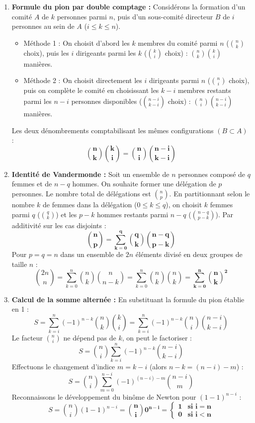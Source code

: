 \documentclass[11pt,a4paper]{article}
\begin{document}
\begin{correctionbox}
\begin{enumerate}
    \item \textbf{Formule du pion par double comptage :}
    Considérons la formation d'un comité $A$ de $k$ personnes parmi $n$, puis d'un sous-comité directeur $B$ de $i$ personnes au sein de $A$ ($i \le k \le n$).
    \begin{itemize}[label=$\bullet$]
        \item Méthode 1 : On choisit d'abord les $k$ membres du comité parmi $n$ ($\binom{n}{k}$ choix), puis les $i$ dirigeants parmi les $k$ ($\binom{k}{i}$ choix) : $\binom{n}{k} \binom{k}{i}$ manières.
        \item Méthode 2 : On choisit directement les $i$ dirigeants parmi $n$ ($\binom{n}{i}$ choix), puis on complète le comité en choisissant les $k - i$ membres restants parmi les $n - i$ personnes disponibles ($\binom{n-i}{k-i}$ choix) : $\binom{n}{i} \binom{n-i}{k-i}$ manières.
    \end{itemize}
    Les deux dénombrements comptabilisant les mêmes configurations $(B \subset A)$ :
    \[
    \mathbf{\binom{n}{k} \binom{k}{i} = \binom{n}{i} \binom{n - i}{k - i}}
    \]

    \item \textbf{Identité de Vandermonde :}
    Soit un ensemble de $n$ personnes composé de $q$ femmes et de $n - q$ hommes.
    On souhaite former une délégation de $p$ personnes. Le nombre total de délégations est $\binom{n}{p}$.
    En partitionnant selon le nombre $k$ de femmes dans la délégation ($0 \le k \le q$), on choisit $k$ femmes parmi $q$ ($\binom{q}{k}$) et les $p - k$ hommes restants parmi $n - q$ ($\binom{n-q}{p-k}$).
    Par additivité sur les cas disjoints :
    \[
    \mathbf{\binom{n}{p} = \sum_{k=0}^q \binom{q}{k} \binom{n - q}{p - k}}
    \]
    Pour $p = q = n$ dans un ensemble de $2n$ éléments divisé en deux groupes de taille $n$ :
    \[
    \binom{2n}{n} = \sum_{k=0}^n \binom{n}{k} \binom{n}{n - k} = \sum_{k=0}^n \binom{n}{k} \binom{n}{k} = \mathbf{\sum_{k=0}^n \binom{n}{k}^2}
    \]

    \item \textbf{Calcul de la somme alternée :}
    En substituant la formule du pion établie en 1 :
    \[
    S = \sum_{k=i}^n (-1)^{n - k} \binom{n}{k} \binom{k}{i} = \sum_{k=i}^n (-1)^{n - k} \binom{n}{i} \binom{n - i}{k - i}
    \]
    Le facteur $\binom{n}{i}$ ne dépend pas de $k$, on peut le factoriser :
    \[
    S = \binom{n}{i} \sum_{k=i}^n (-1)^{n - k} \binom{n - i}{k - i}
    \]
    Effectuons le changement d'indice $m = k - i$ (alors $n - k = (n - i) - m$) :
    \[
    S = \binom{n}{i} \sum_{m=0}^{n - i} (-1)^{(n - i) - m} \binom{n - i}{m}
    \]
    Reconnaissons le développement du binôme de Newton pour $(1 - 1)^{n - i}$ :
    \[
    S = \binom{n}{i} (1 - 1)^{n - i} = \mathbf{\binom{n}{i} 0^{n - i} = \begin{cases} 1 & \text{si } i = n \\ 0 & \text{si } i < n \end{cases}}
    \]


\end{enumerate}
\end{correctionbox}
\end{document}
